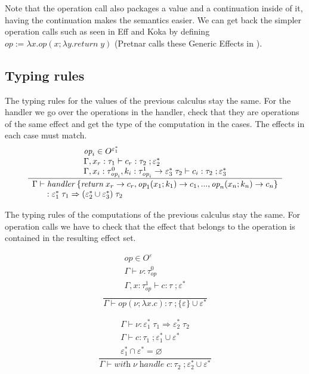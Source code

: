 \documentclass[12pt]{article}
\newcommand\eff[0]{\varepsilon}
\newcommand\effs[0]{\eff^*}
\newcommand\eop[0]{\textit{op}}
\newcommand\eops[1]{O^{#1}}
\newcommand\type[0]{\tau}
\newcommand\tarre[3]{#1 \rightarrow #2 \; #3}
\newcommand\thandler[4]{#1 \; #2 \Rightarrow #3 \; #4}
\newcommand\val[0]{\nu}
\newcommand\vabs[2]{\lambda #1 . #2}
\newcommand\vhandler[1]{\textit{handler} \; \{#1\}}
\newcommand\comp[0]{c}
\newcommand\creturn[1]{\textit{return} \; #1}
\newcommand\cop[4]{#1(#2 ; \lambda #3 . #4)}
\newcommand\chandle[2]{\textit{with} \; #1 \; \textit{handle} \; #2}
\begin{document}
Note that the operation call also packages a value and a continuation inside of it, having the continuation makes the semantics easier.
We can get back the simpler operation calls such as seen in Eff and Koka by defining $\eop := \vabs{x}{\cop{\eop}{x}{y}{\creturn{y}}}$ (Pretnar calls these Generic Effects in \cite{pretnar}).

\subsection{Typing rules}

The typing rules for the values of the previous calculus stay the same.
For the handler we go over the operations in the handler, check that they are operations of the same effect and get the type of the computation in the cases. The effects in each case must match.
\[\frac{
	\begin{array}{l}
	\eop_i \in \eops{\effs_1} \\
	\Gamma , x_r : \type_1 \vdash \comp_r : \type_2 \; ; \effs_2 \\
	\Gamma , x_i : \type^0_{\eop_i} , k_i : \tarre{\type^1_{\eop_i}}{\effs_3}{\type_2} \vdash \comp_i : \type_2 \; ; \effs_3
	\end{array}
}{
	\begin{array}{l}
	\Gamma \vdash \vhandler{
		\textit{return} \; x_r \rightarrow \comp_r,
		\eop_1 ( x_1 ; k_1 ) \rightarrow \comp_1,
		...,
		\eop_n ( x_n ; k_n ) \rightarrow \comp_n
	} \\ \indent : \thandler{\effs_1}{\type_1}{(\effs_2 \cup \effs_3)}{\type_2}
	\end{array}
}\]

The typing rules of the computations of the previous calculus stay the same. For operation calls we have to check that the effect that belongs to the operation is contained in the resulting effect set. \\
\begin{minipage}{0.5\textwidth}
\[\frac{
	\begin{array}{l}
	\eop \in \eops{\eff} \\
	\Gamma \vdash \val : \type^0_\eop \\
	\Gamma , x : \type^1_\eop \vdash \comp : \type \; ; \effs \\
	\end{array}
}{
	\Gamma \vdash \cop{\eop}{\val}{x}{\comp} : \type \; ; \{ \eff \} \cup \effs
}\]
\end{minipage}
\begin{minipage}{0.5\textwidth}
\[\frac{
	\begin{array}{l}
	\Gamma \vdash \val : \thandler{\effs_1}{\type_1}{\effs_2}{\type_2} \\
	\Gamma \vdash \comp : \type_1 \; ; \effs_1 \cup \effs \\
	\effs_1 \cap \effs = \varnothing
	\end{array}
}{
	\Gamma \vdash \chandle{\val}{\comp} : \type_2 \; ; \effs_2 \cup \effs
}\]
\end{minipage}
\end{document}
